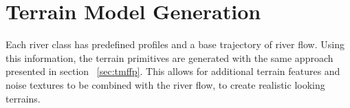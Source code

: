 \section{Terrain Model Generation}
Each river class has predefined profiles and a base trajectory of river flow. Using this information, the terrain primitives are generated with the same approach presented in section ~\ref{sec:tmffp}. This allows for additional terrain features and noise textures to be combined with the river flow, to create realistic looking terrains. 
